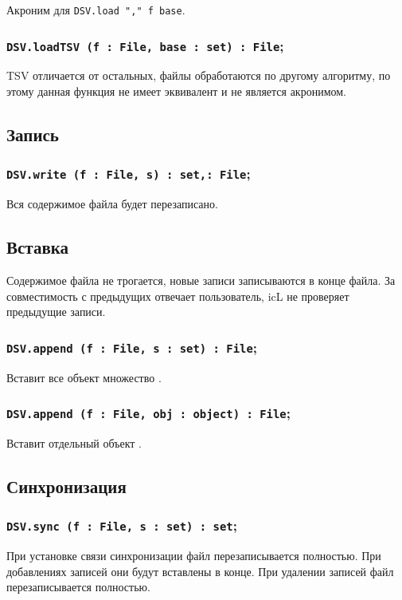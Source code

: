 Акроним для \lstinline|DSV.load "," f base|.

\subsubsection{\lstinline|DSV.loadTSV (f : File, base : set) : File|;}

TSV отличается от остальных, файлы обработаются по другому алгоритму, по этому данная функция не имеет эквивалент и не является акронимом.

\subsection{Запись}

\subsubsection{\lstinline|DSV.write (f : File, s) : set,: File|;}

Вся содержимое файла будет перезаписано.

\subsection{Вставка}

Содержимое файла не трогается, новые записи записываются в конце файла. За совместимость с предыдущих отвечает пользователь, icL не проверяет предыдущие записи.

\subsubsection{\lstinline|DSV.append (f : File, s : set) : File|;}

Вставит все объект множество .

\subsubsection{\lstinline|DSV.append (f : File, obj : object) : File|;}

Вставит отдельный объект .

\subsection{Синхронизация}

\subsubsection{\lstinline|DSV.sync (f : File, s : set) : set|;}

При установке связи синхронизации файл перезаписывается полностью. При добавлениях записей они будут вставлены в конце. При удалении записей файл перезаписывается полностью.


